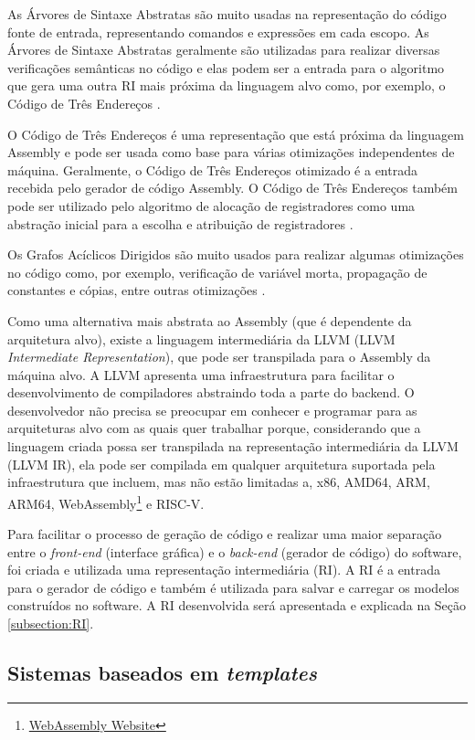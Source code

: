\documentclass[
	12pt,				%
	openright,			%
	oneside,			%
	a4paper,			%
	main=brazil,
	english,			%
	]{ufsj-abntex2}
\begin{document}
As Árvores de Sintaxe Abstratas são muito usadas na representação do código fonte de entrada, representando comandos e expressões em cada escopo. As Árvores de Sintaxe Abstratas geralmente são utilizadas para realizar diversas verificações semânticas no código e elas podem ser a entrada para o algoritmo que gera uma outra RI mais próxima da linguagem alvo como, por exemplo, o Código de Três Endereços \cite{dragonBook}. 

O Código de Três Endereços é uma representação que está próxima da linguagem Assembly e pode ser usada como base para várias otimizações independentes de máquina. Geralmente, o Código de Três Endereços otimizado é a entrada recebida pelo gerador de código Assembly. O Código de Três Endereços também pode ser utilizado pelo algoritmo de alocação de registradores como uma abstração inicial para a escolha e atribuição de registradores \cite{dragonBook}. 

Os Grafos Acíclicos Dirigidos são muito usados para realizar algumas otimizações no código como, por exemplo, verificação de variável morta, propagação de constantes e cópias, entre outras otimizações \cite{dragonBook}. 

Como uma alternativa mais abstrata ao Assembly (que é dependente da arquitetura alvo), existe a linguagem intermediária da LLVM (LLVM \textit{Intermediate Representation}), que pode ser transpilada para o Assembly da máquina alvo. A LLVM apresenta uma infraestrutura para facilitar o desenvolvimento de compiladores abstraindo toda a parte do backend. O desenvolvedor não precisa se preocupar em conhecer e programar para as arquiteturas alvo com as quais quer trabalhar porque, considerando que a linguagem criada possa ser transpilada na representação intermediária da LLVM (LLVM IR), ela pode ser compilada em qualquer arquitetura suportada pela infraestrutura que incluem, mas não estão limitadas a, x86, AMD64, ARM, ARM64, WebAssembly\footnote{\href{https://webassembly.org/}{WebAssembly Website}} e RISC-V.

Para facilitar o processo de geração de código e realizar uma maior separação entre o \textit{front-end} (interface gráfica) e o \textit{back-end} (gerador de código) do software, foi criada e utilizada uma representação intermediária (RI). A RI é a entrada para o gerador de código e também é utilizada para salvar e carregar os modelos construídos no software. A RI desenvolvida será apresentada e explicada na Seção \ref{subsection:RI}.

\subsection{Sistemas baseados em \textit{templates}}
 
\end{document}
